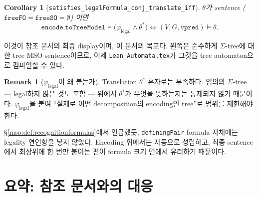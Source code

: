\documentclass[11pt]{article}
\theoremstyle{definition}
\newtheorem{remark}[definition]{Remark}
\theoremstyle{plain}
\newtheorem{corollary}[definition]{Corollary}
\newcommand{\lean}[1]{\texttt{#1}}
\newcommand{\leanfile}[1]{\texttt{#1}}
\begin{document}
\begin{corollary}[\lean{satisfies\_legalFormula\_conj\_translate\_iff}]
\label{mso:cor:finaldisplay}
$\theta$가 sentence ($\lean{freeFO} = \lean{freeSO} = \emptyset$) 이면
\[
  \lean{encode}.\lean{toTreeModel} \models
    \bigl(\varphi_{\mathrm{legal}} \land \theta^\ast\bigr)
  \iff
  (V, G, \lean{vpred}) \models \theta.
\]
\end{corollary}

이것이 참조 문서의 최종 display이며, 이 문서의 목표다. 왼쪽은 순수하게
$\Sigma$-tree에 대한 tree MSO sentence이므로, 이제
\leanfile{Lean\_Automata.tex}가 그것을 tree automaton으로 컴파일할 수 있다.

\begin{remark}[$\varphi_{\mathrm{legal}}$이 왜 붙는가]
Translation $\theta^\ast$ 혼자로는 부족하다. 임의의 $\Sigma$-tree --- legal하지
않은 것도 포함 --- 위에서 $\theta^\ast$가 무엇을 뜻하는지는 통제되지 않기
때문이다. $\varphi_{\mathrm{legal}}$을 붙여 ``실제로 어떤 decomposition의
encoding인 tree''로 범위를 제한해야 한다.

\S\ref{mso:def:recognitionformulas}에서 언급했듯, \lean{definingPair} formula
자체에는 legality 연언항을 넣지 않았다. Encoding 위에서는 자동으로 성립하고,
최종 sentence에서 최상위에 한 번만 붙이는 편이 formula 크기 면에서 유리하기
때문이다.
\end{remark}

\section{요약: 참조 문서와의 대응}
\label{mso:sec:summary}
\end{document}

